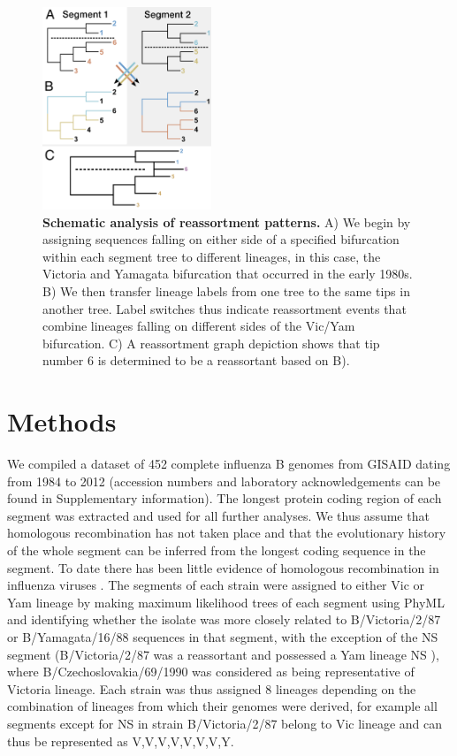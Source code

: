 \documentclass[11pt,oneside,letterpaper]{article}
\begin{document}
\begin{figure}[h]
 \centering		
	\includegraphics[width=0.45\textwidth]{figures/TreeFigure2}
	\caption{\textbf{Schematic analysis of reassortment patterns.}
	A) We begin by assigning sequences falling on either side of a specified bifurcation within each segment tree to different lineages, in this case, the Victoria and Yamagata bifurcation that occurred in the early 1980s.
	B) We then transfer lineage labels from one tree to the same tips in another tree.
	Label switches thus indicate reassortment events that combine lineages falling on different sides of the Vic/Yam bifurcation.
	C) A reassortment graph depiction shows that tip number 6 is determined to be a reassortant based on B).
	}
	\label{methodFig}
\end{figure}

\section*{Methods}
We compiled a dataset of 452 complete influenza B genomes from GISAID \cite{GISAID} dating from 1984 to 2012 (accession numbers and laboratory acknowledgements can be found in Supplementary information).
The longest protein coding region of each segment was extracted and used for all further analyses.
We thus assume that homologous recombination has not taken place and that the evolutionary history of the whole segment can be inferred from the longest coding sequence in the segment.
To date there has been little evidence of homologous recombination in influenza viruses \cite{chare2003,boni2008,han2010}.
The segments of each strain were assigned to either Vic or Yam lineage by making maximum likelihood trees of each segment using PhyML \cite{guindon2003} and identifying whether the isolate was more closely related to B/Victoria/2/87 or B/Yamagata/16/88 sequences in that segment, with the exception of the NS segment (B/Victoria/2/87 was a reassortant and possessed a Yam lineage NS \cite{lindstrom1999}), where B/Czechoslovakia/69/1990 was considered as being representative of Victoria lineage.
Each strain was thus assigned 8 lineages depending on the combination of lineages from which their genomes were derived, for example all segments except for NS in strain B/Victoria/2/87 belong to Vic lineage and can thus be represented as V,V,V,V,V,V,V,Y. 
\end{document}
